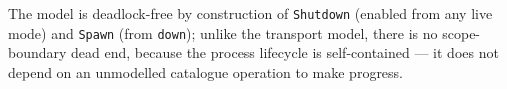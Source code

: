 \documentclass[a4paper,10pt,fleqn]{article}
\begin{document}
The model is deadlock-free by construction of \texttt{Shutdown} (enabled from
any live mode) and \texttt{Spawn} (from \texttt{down}); unlike the transport
model, there is no scope-boundary dead end, because the process lifecycle is
self-contained --- it does not depend on an unmodelled catalogue operation to
make progress.
\end{document}
